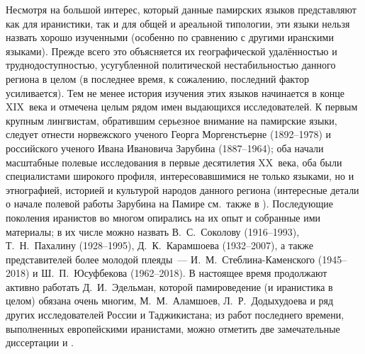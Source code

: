 Несмотря на большой интерес, который данные памирских языков представляют как для иранистики, так и для общей и ареальной типологии, эти языки нельзя назвать хорошо изученными (особенно по сравнению с другими иранскими языками). Прежде всего это объясняется их географической удалённостью и труднодоступностью, усугубленной политической нестабильностью данного региона в целом (в последнее время, к сожалению, последний фактор усиливается). Тем не менее история изучения этих языков начинается в конце XIX~века и отмечена целым рядом имен выдающихся исследователей. К первым крупным лингвистам, обратившим серьезное внимание на памирские языки, следует отнести норвежского ученого Георга Моргенстьерне (1892–1978) и российского ученого Ивана Ивановича Зарубина (1887–1964); оба начали масштабные полевые исследования в первые десятилетия XX~века, оба были специалистами широкого профиля, интересовавшимися не только языками, но и этнографией, историей и культурой народов данного региона (интересные детали о начале полевой работы Зарубина на Памире см.~также в \parencite{steblin_kamenskiy1993}). Последующие поколения иранистов во многом опирались на их опыт и собранные ими материалы; в их числе можно назвать В.~С.~Соколову (1916–1993), Т.~Н.~Пахалину (1928–1995), Д.~К.~Карамшоева (1932–2007), а также представителей более молодой плеяды~— И.~М.~Стеблина-Каменского (1945–2018) и Ш.~П.~Юсуфбекова (1962–2018). В настоящее время продолжают активно работать Д.~И.~Эдельман, которой памироведение (и иранистика в целом) обязана очень многим, М.~М.~Аламшоев, Л.~Р.~Додыхудоева и ряд других исследователей России и Таджикистана; из работ последнего времени, выполненных европейскими иранистами, можно отметить две замечательные диссертации \parencite{kim2017} и \parencite{obrtelova2019_text}.

